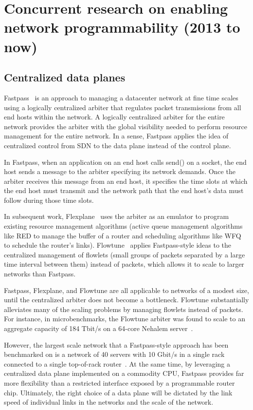 \section{Concurrent research on enabling network programmability (2013 to now)}
\label{s:concurrent}

\subsection{Centralized data planes}
Fastpass~\cite{fastpass} is an approach to managing a datacenter network at
fine time scales using a logically centralized arbiter that regulates packet
transmissions from all end hosts within the network. A logically centralized
arbiter for the entire network provides the arbiter with the global visibility
needed to perform resource management for the entire network. In a sense,
Fastpass applies the idea of centralized control from SDN to the data plane
instead of the control plane.

In Fastpass, when an application on an end host calls send() on a socket, the
end host sends a message to the arbiter specifying its network demands. Once
the arbiter receives this message from an end host, it specifies the time slots
at which the end host must transmit and the network path that the end host's
data must follow during those time slots. 

In subsequent work, Flexplane~\cite{flexplane} uses the arbiter as an emulator
to program existing resource management algorithms (\eg active queue management
algorithms like RED to manage the buffer of a router and scheduling algorithms
like WFQ to schedule the router's links).  Flowtune~\cite{flowtune} applies
Fastpass-style ideas to the centralized management of flowlets (small groups of
packets separated by a large time interval between them) instead of packets,
which allows it to scale to larger networks than Fastpass.

Fastpass, Flexplane, and Flowtune are all applicable to networks of a modest
size, until the centralized arbiter does not become a bottleneck. Flowtune
substantially alleviates many of the scaling problems by managing flowlets
instead of packets. For instance, in microbenchmarks, the Flowtune arbiter was
found to scale to an aggregate capacity of 184 Tbit/s on a 64-core Nehalem
server~\cite{flowtune}.

However, the largest scale network that a Fastpass-style approach has been
benchmarked on is a network of 40 servers with 10 Gbit/s in a single rack
connected to a single top-of-rack router~\cite{flexplane}. At the same time, by
leveraging a centralized data plane implemented on a commodity CPU, Fastpass
provides far more flexibility than a restricted interface exposed by a
programmable router chip.  Ultimately, the right choice of a data plane will be
dictated by the link speed of individual links in the networks and the scale of
the network.

